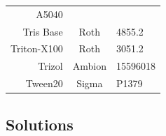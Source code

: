 \documentclass[11pt,singlespacinge,twoside]{reedthesis} %
\begin{document}
\begin{longtable}[]{@{}rcl@{}}
\begin{minipage}[t]{0.16\columnwidth}
A5040\strut
\end{minipage}\tabularnewline
\begin{minipage}[t]{0.26\columnwidth}\raggedleft
Tris Base\strut
\end{minipage} & \begin{minipage}[t]{0.50\columnwidth}\centering
Roth\strut
\end{minipage} & \begin{minipage}[t]{0.16\columnwidth}\raggedright
4855.2\strut
\end{minipage}\tabularnewline
\begin{minipage}[t]{0.26\columnwidth}\raggedleft
Triton-X100\strut
\end{minipage} & \begin{minipage}[t]{0.50\columnwidth}\centering
Roth\strut
\end{minipage} & \begin{minipage}[t]{0.16\columnwidth}\raggedright
3051.2\strut
\end{minipage}\tabularnewline
\begin{minipage}[t]{0.26\columnwidth}\raggedleft
Trizol\strut
\end{minipage} & \begin{minipage}[t]{0.50\columnwidth}\centering
Ambion\strut
\end{minipage} & \begin{minipage}[t]{0.16\columnwidth}\raggedright
15596018\strut
\end{minipage}\tabularnewline
\begin{minipage}[t]{0.26\columnwidth}\raggedleft
Tween20\strut
\end{minipage} & \begin{minipage}[t]{0.50\columnwidth}\centering
Sigma\strut
\end{minipage} & \begin{minipage}[t]{0.16\columnwidth}\raggedright
P1379\strut
\end{minipage}\tabularnewline
\bottomrule
\end{longtable}
\hypertarget{mat-sol}{%
\subsection{Solutions}\label{mat-sol}}
\end{document}
